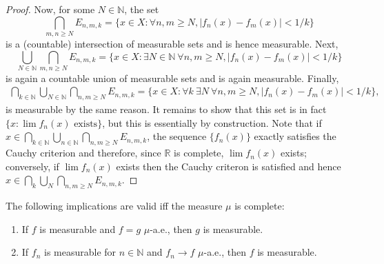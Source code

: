 \documentclass[11pt]{article}
\begin{document}
\begin{proof}
	Now, for some \( N \in \mathbb{N} \), the set
	\begin{equation}
		\label{eq:3}
		\bigcap_{m,n \ge N} E_{n,m,k} = \{ x \in X : \forall n,m \geq N, \left| f_n(x) - f_m(x) \right| < 1/k \}
	\end{equation}
	is a (countable) intersection of measurable sets and is hence measurable.
	Next,
	\begin{equation}
		\label{eq:4}
		\bigcup_{N \in \mathbb{N}} \bigcap_{m,n \geq N} E_{n,m,k} = \{ x \in X : \exists N \in \mathbb{N} \ \forall n,m \geq N, \left| f_n(x) - f_m(x) \right| < 1/k \}
	\end{equation}
	is again a countable union of measurable sets and is again measurable.
	Finally,
	\begin{equation}
		\label{eq:5}
		\begin{aligned}
			\bigcap_{k \in \mathbb{N}} \bigcup_{N \in \mathbb{N}} \bigcap_{n,m \geq N} E_{n,m,k} = \{ x \in X : \forall k \ \exists N \ \forall n,m \geq N, |f_n(x) - f_m(x) | < 1/k\},
		\end{aligned}
	\end{equation}
	is measurable by the same reason.
	It remains to show that this set is in fact \( \{ x : \lim f_n(x) \text{ exists}\} \), but this is essentially by construction.
	Note that if \( x \in \bigcap_{k \in \mathbb{N}} \bigcup_{n \in \mathbb{N}} \bigcap_{n,m \geq N} E_{n,m,k} \), the sequence \( \{f_n(x)\} \) exactly satisfies the Cauchy criterion and therefore, since \( \mathbb{R} \) is complete, \( \lim f_{n}(x) \) exists; conversely, if \( \lim f_n(x) \) exists then the Cauchy criteron is satisfied and hence \( x \in \bigcap_k \bigcup_N \bigcap_{n,m \geq N} E_{n,m,k} \).
\end{proof}

\begin{prop}[2.11]
	The following implications are valid iff the measure \(\mu\) is complete:
	\begin{enumerate}[label=(\alph*)]
		\item If \( f \) is measurable and \( f = g \) \(\mu\)-a.e., then \( g \) is measurable.
		\item If \( f_n \) is measurable for \( n \in \mathbb{N} \) and \( f_n \rightarrow f \) \(\mu\)-a.e., then \( f \) is measurable.
	\end{enumerate}
\end{prop}
\end{document}
